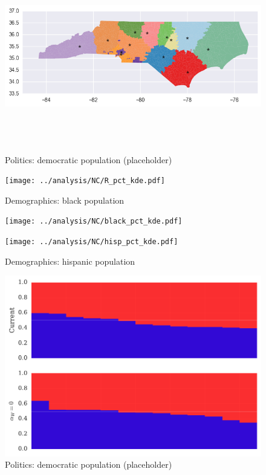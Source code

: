\begin{figure}[htb!]
\includegraphics[width=5in,height=3in,keepaspectratio]{../maps/NC/static/0_25_after.png}
\end{figure}

\clearpage
\newpage

\begin{figure}[htb!] \centering
\caption{ Politics: democratic population (placeholder)}
\texttt{[image: ../analysis/NC/R\_pct\_kde.pdf]}
\caption{ Demographics: black population }
\texttt{[image: ../analysis/NC/black\_pct\_kde.pdf]}
\caption{ Demographics: hispanic population }
\texttt{[image: ../analysis/NC/hisp\_pct\_kde.pdf]}
\end{figure}

\clearpage
\newpage

\begin{figure}[htb!] \centering
\caption{ Politics: democratic population (placeholder)}
\includegraphics[width=6in]{../analysis/NC/barplot.pdf}
\end{figure}

